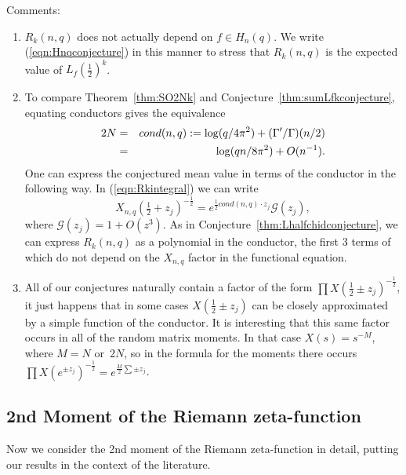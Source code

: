 \documentclass[12pt,letterpaper]{amsart}
\theoremstyle{plain}
\theoremstyle{definition}
\theoremstyle{remark}
\numberwithin{equation}{subsection}
\numberwithin{theorem}{subsection}
\numberwithin{table}{subsection}
\begin{document}
Comments:
\begin{enumerate}

\item $R_k(n,q)$ does not actually depend on $f\in H_n(q)$.  We write
(\ref{eqn:Hnqconjecture}) in this manner to stress that $R_k(n,q)$
is the expected value of $L_f(\frac12)^k$.  

\item To compare Theorem~\ref{thm:SO2Nk} and
 Conjecture~\ref{thm:sumLfkconjecture}, equating
conductors gives the equivalence
\begin{eqnarray}\label{eqn:Hnqconductor}
2N&=&cond(n,q):=\log ({q}/{4\pi^2}) + (\Gamma'/\Gamma)(n/2) \cr
&=& \log ({qn}/{8\pi^2}) +  O(n^{-1}).  
\end{eqnarray}
One can express the conjectured mean value in terms of the conductor in the
following way.  In (\ref{eqn:Rkintegral}) we can write
\begin{equation}
X_{n,q}(\tfrac12+z_j)^{-\frac12} = e^{\frac12 cond(n,q)\cdot z_j} {\mathcal G}(z_j),
\end{equation}
where ${\mathcal G}(z_j)=1+O(z^3)$.  As in Conjecture~\ref{thm:Lhalfchidconjecture},
we can express
$R_k(n,q)$ as a polynomial in the conductor, the first 3 terms of which
do not depend on the $X_{n,q}$ factor in the functional equation.

\item All of our conjectures naturally contain a factor of the form
$\prod X(\frac12\pm z_j)^{-\frac12}$, it just happens that in some
cases $X(\frac12\pm z_j)$ can be closely approximated by a simple function
of the conductor.  It is interesting that this same factor occurs in 
all of the
random matrix moments. In that case $X(s)=s^{-M}$, where $M=N$ or~$2 N$,
so in the formula for the
moments there occurs
$\prod X(e^{\pm z_j})^{- \frac12}=e^{\frac{M}{2}\sum \pm z_j}$.

\end{enumerate}


\subsection{  2nd Moment of the Riemann zeta-function
}\label{sec:secondmoment}



Now we consider   the 2nd moment of the Riemann zeta-function in
detail, putting our results in the context of the literature.
\end{document}
